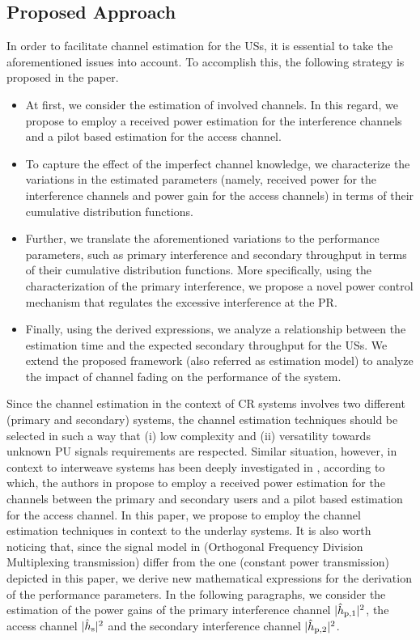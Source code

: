 \subsection{Proposed Approach} 
In order to facilitate channel estimation for the USs, it is essential to take the aforementioned issues into account. To accomplish this, the following strategy is proposed in the paper.
\begin{itemize}
\item At first, we consider the estimation of involved channels. In this regard, we propose to employ a received power estimation for the interference channels and a pilot based estimation for the access channel. 
\item To capture the effect of the imperfect channel knowledge, we characterize the variations in the estimated parameters (namely, received power for the interference channels and power gain for the access channels) in terms of their cumulative distribution functions.
\item Further, we translate the aforementioned variations to the performance parameters, such as primary interference and secondary throughput in terms of their cumulative distribution functions. More specifically, using the characterization of the primary interference, we propose a novel power control mechanism that regulates the excessive interference at the PR.  
\item Finally, using the derived expressions, we analyze a relationship between the estimation time and the expected secondary throughput for the USs. We extend the proposed framework (also referred as estimation model) to analyze the impact of channel fading on the performance of the system. 
\end{itemize}
Since the channel estimation in the context of CR systems involves two different (primary and secondary) systems, the channel estimation techniques should be selected in such a way that (i) low complexity and (ii) versatility towards unknown PU signals requirements are respected. Similar situation, however, in context to interweave systems has been deeply investigated in \cite{Kaushik16}, according to which, the authors in \cite{Kaushik16} propose to employ a received power estimation for the channels between the primary and secondary users and a pilot based estimation for the access channel. In this paper, we propose to employ the channel estimation techniques in context to the underlay systems. It is also worth noticing that, since the signal model in \cite{Kaushik16} (Orthogonal Frequency Division Multiplexing transmission) differ from the one (constant power transmission) depicted in this paper, we derive new mathematical expressions for the derivation of the performance parameters. 
In the following paragraphs, we consider the estimation of the power gains of the primary interference channel $|\hat{h}_{\text{p,1}}|^2$, the access channel $|\hat{h}_{\text{s}}|^2$ and the secondary interference channel $|\hat{h}_{\text{p,2}}|^2$. 
